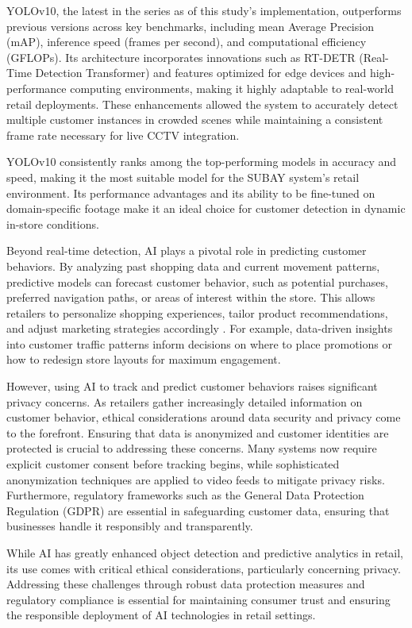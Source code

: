 {YOLOv10, the latest in the series as of this study’s implementation, outperforms previous versions across key benchmarks, including mean Average Precision (mAP), inference speed (frames per second), and computational efficiency (GFLOPs). Its architecture incorporates innovations such as RT-DETR (Real-Time Detection Transformer) and features optimized for edge devices and high-performance computing environments, making it highly adaptable to real-world retail deployments. These enhancements allowed the system to accurately detect multiple customer instances in crowded scenes while maintaining a consistent frame rate necessary for live CCTV integration.

YOLOv10 consistently ranks among the top-performing models in accuracy and speed, making it the most suitable model for the SUBAY system’s retail environment. Its performance advantages and its ability to be fine-tuned on domain-specific footage make it an ideal choice for customer detection in dynamic in-store conditions.

Beyond real-time detection, AI plays a pivotal role in predicting customer behaviors. By analyzing past shopping data and current movement patterns, predictive models can forecast customer behavior, such as potential purchases, preferred navigation paths, or areas of interest within the store. This allows retailers to personalize shopping experiences, tailor product recommendations, and adjust marketing strategies accordingly \citep{Kulkarni2023}. For example, data-driven insights into customer traffic patterns inform decisions on where to place promotions or how to redesign store layouts for maximum engagement.

However, using AI to track and predict customer behaviors raises significant privacy concerns. As retailers gather increasingly detailed information on customer behavior, ethical considerations around data security and privacy come to the forefront. Ensuring that data is anonymized and customer identities are protected is crucial to addressing these concerns. Many systems now require explicit customer consent before tracking begins, while sophisticated anonymization techniques are applied to video feeds to mitigate privacy risks. Furthermore, regulatory frameworks such as the General Data Protection Regulation (GDPR) are essential in safeguarding customer data, ensuring that businesses handle it responsibly and transparently.

While AI has greatly enhanced object detection and predictive analytics in retail, its use comes with critical ethical considerations, particularly concerning privacy. Addressing these challenges through robust data protection measures and regulatory compliance is essential for maintaining consumer trust and ensuring the responsible deployment of AI technologies in retail settings.

}
